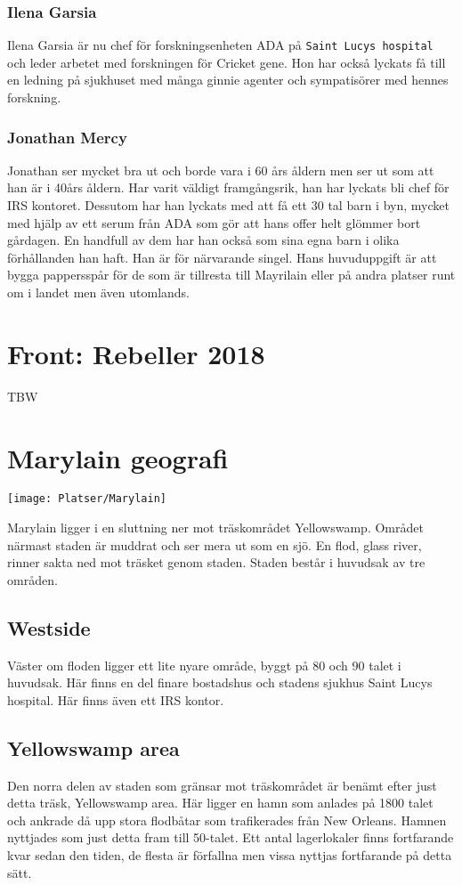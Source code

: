 \documentclass[a5paper,10pt]{report}
\begin{document}
\subsubsection{Ilena Garsia}
Ilena Garsia är nu chef för forskningsenheten ADA på \texttt{Saint Lucys hospital} och leder arbetet med forskningen för Cricket gene. Hon har också lyckats få till en ledning på sjukhuset med många ginnie agenter och sympatisörer med hennes forskning.
\subsubsection{Jonathan Mercy}
Jonathan ser mycket bra ut och borde vara i 60 års åldern men ser ut som att han är i 40års åldern. Har varit väldigt framgångsrik, han har lyckats bli chef för IRS kontoret. Dessutom har han lyckats med att få ett 30 tal barn i byn, mycket med hjälp av ett serum från ADA som gör att hans offer helt glömmer bort gårdagen. En handfull av dem har han också som sina egna barn i olika förhållanden han haft. Han är för närvarande singel. Hans huvuduppgift är att bygga pappersspår för de som är tillresta till Mayrilain eller på andra platser runt om i landet men även utomlands.
\section{Front: Rebeller 2018}
TBW
\section{Marylain geografi}
\texttt{[image: Platser/Marylain]}

Marylain ligger i en sluttning ner mot träskområdet Yellowswamp. Området närmast staden är muddrat och ser mera ut som en sjö. En flod, glass river, rinner sakta ned mot träsket genom staden. Staden består i huvudsak av tre områden.
\subsection{Westside}
Väster om floden ligger ett lite nyare område, byggt på 80 och 90 talet i huvudsak. Här finns en del finare bostadshus och stadens sjukhus Saint Lucys hospital. Här finns även ett IRS kontor.
\subsection{Yellowswamp area}
Den norra delen av staden som gränsar mot träskområdet är benämt efter just detta träsk, Yellowswamp area. Här ligger en hamn som anlades på 1800 talet och ankrade då upp stora flodbåtar som trafikerades från New Orleans. Hamnen nyttjades som just detta fram till 50-talet. Ett antal lagerlokaler finns fortfarande kvar sedan den tiden, de flesta är förfallna men vissa nyttjas fortfarande på detta sätt.
\end{document}
